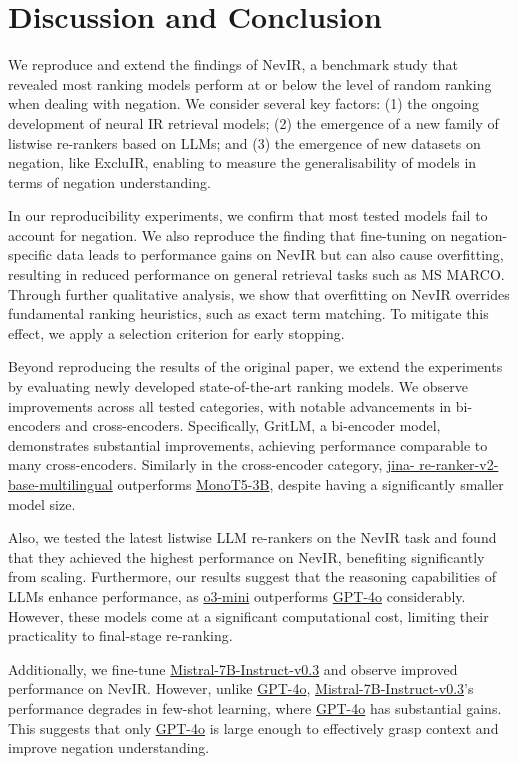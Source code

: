 
\section{Discussion and Conclusion}
We reproduce and extend the findings of NevIR, a benchmark study that
revealed most ranking models perform at or below the level of random ranking when dealing with negation. We consider several key factors: (1) the ongoing development of neural IR retrieval models; (2) the emergence of a new family of listwise re-rankers based
on LLMs; and (3) the emergence of new datasets on negation, like ExcluIR, enabling to measure the generalisability of models in terms of negation understanding.

In our reproducibility experiments, we confirm that most tested models fail to account for negation. We also reproduce the finding that fine-tuning on negation-specific data leads to performance gains on NevIR but can also cause overfitting, resulting in reduced performance on general retrieval tasks such as MS MARCO. Through further qualitative analysis, we show that overfitting on NevIR overrides fundamental ranking heuristics, such as exact term matching. To mitigate this effect, we apply a selection criterion for early stopping.

Beyond reproducing the results of the original paper, we extend the experiments by evaluating newly developed state-of-the-art ranking models. We observe improvements across all tested categories, with notable advancements in bi-encoders and cross-encoders. Specifically, GritLM, a bi-encoder model, demonstrates substantial improvements, achieving performance comparable to many cross-encoders. Similarly in the cross-encoder category, \url{jina- re-ranker-v2-base-multilingual} outperforms \url{MonoT5-3B}, despite having a significantly smaller model size.

Also, we tested the latest listwise LLM re-rankers on the NevIR task and found that they achieved the highest performance on NevIR, benefiting significantly from scaling. Furthermore, our results suggest that the reasoning capabilities of LLMs enhance performance, as \url{o3-mini} outperforms \url{GPT-4o} considerably. However, these models come at a significant computational cost, limiting their practicality to final-stage re-ranking. 

Additionally, we fine-tune \url{Mistral-7B-Instruct-v0.3} and observe improved performance on NevIR. However, unlike \url{GPT-4o}, \url{Mistral-7B-Instruct-v0.3}'s performance degrades in few-shot learning, where \url{GPT-4o} has substantial gains. This suggests that only \url{GPT-4o} is large enough to effectively grasp context and improve negation understanding.

